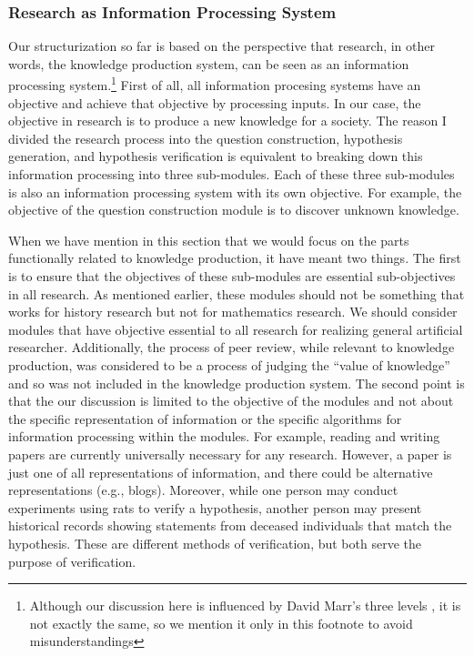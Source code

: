 \documentclass{book}
\begin{document}
\subsubsection{Research as Information Processing System}
Our structurization so far is based on the perspective that research, in other words, the knowledge production system, can be seen as an information processing system.\footnote{Although our discussion here is influenced by David Marr's three levels  \cite{marr2010vision}, it is not exactly the same, so we mention it only in this footnote to avoid misunderstandings} First of all, all information procesing systems have an objective and achieve that objective by processing inputs. In our case, the objective in research is to produce a new knowledge for a society. The reason I divided the research process into the question construction, hypothesis generation, and hypothesis verification is equivalent to breaking down this information processing into three sub-modules. Each of these three sub-modules is also an information processing system with its own objective. For example, the objective of the question construction module is to discover unknown knowledge.

When we have mention in this section that we would focus on the parts functionally related to knowledge production, it have meant two things. The first is to ensure that the objectives of these sub-modules are essential sub-objectives in all research. As mentioned earlier, these modules should not be something that works for history research but not for mathematics research. We should consider modules that have objective essential to all research for realizing general artificial researcher. Additionally, the process of peer review, while relevant to knowledge production, was considered to be a process of judging the ``value of knowledge'' and so was not included in the knowledge production system. The second point is that the our discussion is limited to the objective of the modules and not about the specific representation of information or the specific algorithms for information processing within the modules. For example, reading and writing papers are currently universally necessary for any research. However, a paper is just one of all representations of information, and there could be alternative representations (e.g., blogs). Moreover, while one person may conduct experiments using rats to verify a hypothesis, another person may present historical records showing statements from deceased individuals that match the hypothesis. These are different methods of verification, but both serve the purpose of verification.
\end{document}
